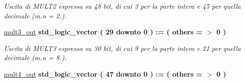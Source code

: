 \begin{DoxyCompactItemize}
\begin{DoxyCompactList}\small\item\em Uscita di M\+U\+L\+T2 espressa su 48 bit, di cui 3 per la parte intera e 45 per quella decimale (m.\+n = 2.). \end{DoxyCompactList}\item 
\hyperlink{group___linear_regression_gafc18f2d32e281bafbb9ecebb30a79221}{mult3\+\_\+out} {\bfseries \textcolor{vhdlchar}{std\+\_\+logic\+\_\+vector}\textcolor{vhdlchar}{ }\textcolor{vhdlchar}{(}\textcolor{vhdlchar}{ }\textcolor{vhdlchar}{ } \textcolor{vhdldigit}{29} \textcolor{vhdlchar}{ }\textcolor{vhdlchar}{downto}\textcolor{vhdlchar}{ }\textcolor{vhdlchar}{ } \textcolor{vhdldigit}{0} \textcolor{vhdlchar}{ }\textcolor{vhdlchar}{)}\textcolor{vhdlchar}{ }\textcolor{vhdlchar}{ }\textcolor{vhdlchar}{ }\textcolor{vhdlchar}{\+:}\textcolor{vhdlchar}{=}\textcolor{vhdlchar}{ }\textcolor{vhdlchar}{(}\textcolor{vhdlchar}{ }\textcolor{vhdlchar}{ }\textcolor{vhdlchar}{others}\textcolor{vhdlchar}{ }\textcolor{vhdlchar}{ }\textcolor{vhdlchar}{=}\textcolor{vhdlchar}{ }\textcolor{vhdlchar}{$>$}\textcolor{vhdlchar}{ }\textcolor{vhdlchar}{\textquotesingle{}}\textcolor{vhdlchar}{ } \textcolor{vhdldigit}{0} \textcolor{vhdlchar}{ }\textcolor{vhdlchar}{\textquotesingle{}}\textcolor{vhdlchar}{ }\textcolor{vhdlchar}{)}\textcolor{vhdlchar}{ }} 
\begin{DoxyCompactList}\small\item\em Uscita di M\+U\+L\+T3 espressa su 30 bit, di cui 9 per la parte intera e 21 per quella decimale (m.\+n = 8.). \end{DoxyCompactList}\item 
\hyperlink{group___linear_regression_ga5a0832f93305c3e0a37293a00e17a538}{mult4\+\_\+out} {\bfseries \textcolor{vhdlchar}{std\+\_\+logic\+\_\+vector}\textcolor{vhdlchar}{ }\textcolor{vhdlchar}{(}\textcolor{vhdlchar}{ }\textcolor{vhdlchar}{ } \textcolor{vhdldigit}{47} \textcolor{vhdlchar}{ }\textcolor{vhdlchar}{downto}\textcolor{vhdlchar}{ }\textcolor{vhdlchar}{ } \textcolor{vhdldigit}{0} \textcolor{vhdlchar}{ }\textcolor{vhdlchar}{)}\textcolor{vhdlchar}{ }\textcolor{vhdlchar}{ }\textcolor{vhdlchar}{ }\textcolor{vhdlchar}{\+:}\textcolor{vhdlchar}{=}\textcolor{vhdlchar}{ }\textcolor{vhdlchar}{(}\textcolor{vhdlchar}{ }\textcolor{vhdlchar}{ }\textcolor{vhdlchar}{others}\textcolor{vhdlchar}{ }\textcolor{vhdlchar}{ }\textcolor{vhdlchar}{=}\textcolor{vhdlchar}{ }\textcolor{vhdlchar}{$>$}\textcolor{vhdlchar}{ }\textcolor{vhdlchar}{\textquotesingle{}}\textcolor{vhdlchar}{ } \textcolor{vhdldigit}{0} \textcolor{vhdlchar}{ }\textcolor{vhdlchar}{\textquotesingle{}}\textcolor{vhdlchar}{ }\textcolor{vhdlchar}{)}\textcolor{vhdlchar}{ }} 

\end{DoxyCompactItemize}
